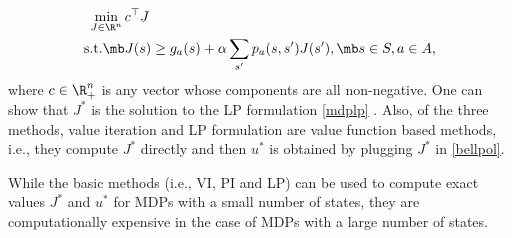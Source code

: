 \begin{align}\label{mdplp}
\begin{split}
\min_{J\in \R^n} \,&c^\top J\\
\text{s.t.}\mb &J(s)\geq g_a(s)+\alpha\sum_{s'}p_a(s,s')J(s'), \mb s\in S, a \in A,
\end{split}
\end{align}
where $c\in \R^n_+$ is any vector whose components are all non-negative. One can show that $J^*$ is the solution to the LP formulation \eqref{mdplp} \cite{BertB}. 
Also, of the three methods, value iteration and LP formulation are value function based methods, i.e., they compute $J^*$ directly and then $u^*$ is obtained by plugging $J^*$ in \eqref{bellpol}.

While the basic methods (i.e., VI, PI and LP) can be used to compute exact values $J^*$ and $u^*$ for MDPs with a small number of states, they are computationally expensive in the case of MDPs with a large number of states.


